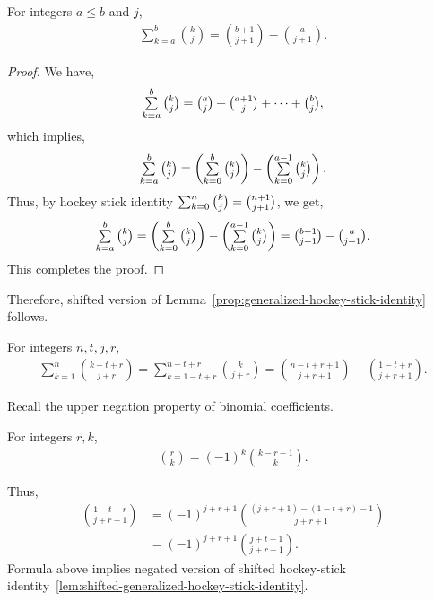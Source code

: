 \begin{lemma}
  \label{prop:generalized-hockey-stick-identity}
  For integers $a \leq b$ and $j$,
  \begin{align*}
    \sum_{k=a}^{b} \binom{k}{j} = \binom{b+1}{j+1} - \binom{a}{j+1}.
  \end{align*}
  \begin{proof}
    We have,
    \begin{align*}
      \mathop{\textstyle\sum}_{k=a}^{b} \tbinom{k}{j} = \tbinom{a}{j} + \tbinom{a+1}{j}
      + \cdots + \tbinom{b}{j},
    \end{align*}
    which implies,
    \begin{align*}
      \mathop{\textstyle\sum}_{k=a}^{b} \tbinom{k}{j} =
      \left( \mathop{\textstyle\sum}_{k=0}^{b} \tbinom{k}{j} \right)
      -
      \left(\mathop{\textstyle\sum}_{k=0}^{a-1} \tbinom{k}{j}\right).
    \end{align*}
    Thus, by hockey stick identity
    $\mathop{\textstyle\sum}_{k=0}^{n} \binom{k}{j} = \binom{n+1}{j+1}$,
    we get,
    \begin{align*}
      \mathop{\textstyle\sum}_{k=a}^{b} \tbinom{k}{j}
      =
      \left(
        \mathop{\textstyle\sum}_{k=0}^{b} \tbinom{k}{j}
      \right)
      -
      \left(
        \mathop{\textstyle\sum}_{k=0}^{a-1} \tbinom{k}{j}
      \right)
      = \tbinom{b+1}{j+1} - \tbinom{a}{j+1}.
    \end{align*}
    This completes the proof.
  \end{proof}
\end{lemma}
Therefore, shifted version of
Lemma~\eqref{prop:generalized-hockey-stick-identity}
follows.
\begin{lemma} 
  For integers $n,t,j,r$,
  \label{lem:shifted-generalized-hockey-stick-identity}
  \begin{align*}
    \sum_{k=1}^{n} \binom{k-t+r}{j+r} = \sum_{k=1-t+r}^{n-t+r} \binom{k}{j+r}
    = \binom{n-t+r+1}{j+r+1} - \binom{1-t+r}{j+r+1}.
  \end{align*}
\end{lemma}

Recall the upper negation property of binomial coefficients.

\begin{lemma} For integers $r,k$,
  \label{lem:upper-negation}
  \begin{align*}
    \binom{r}{k} = (-1)^{k} \binom{k-r-1}{k}.
  \end{align*}
\end{lemma}
Thus,
\begin{align*}
  \binom{1-t+r}{j+r+1}
  &= (-1)^{j+r+1} \binom{(j+r+1)-(1-t+r)-1}{j+r+1} \\
  &= (-1)^{j+r+1} \binom{j+t-1}{j+r+1}.
\end{align*}
Formula above implies negated version of shifted hockey-stick
identity~\eqref{lem:shifted-generalized-hockey-stick-identity}.

